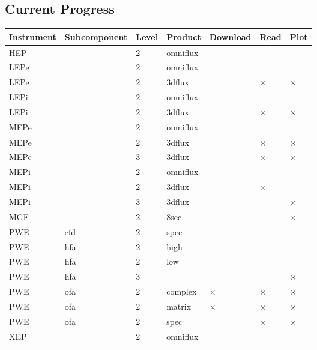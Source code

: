 	\subsection{Current Progress}
	
	\begin{center}
	\begin{tabular}{|l|l|l|l|l|l|l|}
	\hline
	Instrument & Subcomponent & Level & Product & Download & Read & Plot \\
	\hline
	HEP & & 2 & omniflux & \checkmark & \checkmark & \checkmark \\
	LEPe & & 2 & omniflux & \checkmark & \checkmark & \checkmark \\
	LEPe & & 2 & 3dflux & \checkmark & $\times$ & $\times$ \\
	LEPi & & 2 & omniflux & \checkmark & \checkmark & \checkmark \\
	LEPi & & 2 & 3dflux & \checkmark & $\times$ & $\times$ \\
	MEPe & & 2 & omniflux & \checkmark & \checkmark & \checkmark \\
	MEPe & & 2 & 3dflux & \checkmark & $\times$ & $\times$ \\
	MEPe & & 3 & 3dflux & \checkmark & $\times$ & $\times$ \\
	MEPi & & 2 & omniflux & \checkmark & \checkmark & \checkmark \\
	MEPi & & 2 & 3dflux & \checkmark & $\times$ & \checkmark \\
	MEPi & & 3 & 3dflux & \checkmark & \checkmark & $\times$ \\
	MGF & & 2 & 8sec & \checkmark & \checkmark & $\times$ \\
	PWE & efd & 2 & spec & \checkmark & \checkmark & \checkmark \\
	PWE & hfa & 2 & high & \checkmark & \checkmark & \checkmark \\
	PWE & hfa & 2 & low & \checkmark & \checkmark & \checkmark \\
	PWE & hfa & 3 & & \checkmark & \checkmark & $\times$ \\
	PWE & ofa & 2 & complex & $\times$ & $\times$ & $\times$ \\
	PWE & ofa & 2 & matrix & $\times$ & $\times$ & $\times$ \\
	PWE & ofa & 2 & spec & \checkmark & $\times$ & $\times$ \\
	XEP & & 2 & omniflux & \checkmark & \checkmark & \checkmark \\
	\hline
	\end{tabular}
	\end{center}
	
